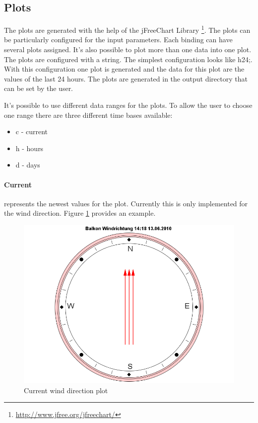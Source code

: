 \subsection{Plots} %
\label{sub:plots}
The plots are generated with the help of the jFreeChart Library \footnote{\url{http://www.jfree.org/jfreechart/}}.
The plots can be particularly configured for the input parameters. Each binding can have several plots assigned. It's also possible to plot more than one data into one plot. The plots are configured with a string. The simplest configuration looks like {\C h24;}. With this configuration one plot is generated and the data for this plot are the values of the last 24 hours. The plots are generated in the output directory that can be set by the user.

It's possible to use different data ranges for the plots. To allow the user to choose one range there are three different time bases available:
\begin{itemize}
	\item c - current
	\item h - hours
	\item d - days
\end{itemize}

\paragraph{Current} %
\label{par:current}
represents the newest values for the plot. Currently this is only implemented for the wind direction. Figure \ref{fig:current} provides an example.
\begin{figure}[ht]
    \centering
    \includegraphics[width=0.9\linewidth]{master/plot_examplec.png}
    \caption{Current wind direction plot}
    \label{fig:current}
\end{figure}

